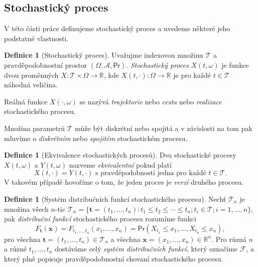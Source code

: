 \documentclass[a4paper,12pt]{report}
\theoremstyle{definition} \newtheorem{definice}[veta]{Definice}
\theoremstyle{remark}
\begin{document}
\subsection{Stochastický proces}
V této části práce definujeme stochastický proces a uvedeme některé jeho podstatné vlastnosti.
\begin{definice}[Stochastický proces]
Uvažujme  indexovou množinu $\mathcal{T}$ a pravděpodobnostní prostor $(\Omega,\mathcal{A}, \mathsf{Pr})$.
\textit{Stochastický proces} $X(t,\omega)$ je funkce dvou proměnných $X:\mathcal{T}\times\Omega\to\mathbb{R}$, kde 
$X(t,\cdot):\Omega\to\mathbb{R}$ je pro každé $t\in\mathcal{T}$ náhodná veličina.

Reálná funkce $X(\cdot,\omega)$ se nazývá \textit{trajektorie} nebo \textit{cesta} nebo \textit{realizace} stochastického procesu. 
\end{definice}
Množina parametrů $\mathcal{T}$ může být diskrétní nebo spojitá a v závislosti na tom pak mluvíme o \textit{diskrétním} nebo \textit{spojitém} stochastickém procesu. 

\begin{definice}[Ekvivalence stochastických procesů]
Dva stochastické procesy $X(t,\omega)$ a $Y(t,\omega)$ nazveme \textit{ekvivalentní} pokud platí
$$X(t,\cdot)=Y(t,\cdot)\text{ s pravděpodobností jedna pro každé }t\in\mathcal{T}.$$ 
V takovém případě hovoříme o tom, že jeden proces je \textit{verzí} druhého procesu.
\end{definice}

\begin{definice}[Systém distribučních funkcí stochastického procesu]
Nechť $\mathcal{T}_n$ je množina všech $n$-tic $\mathcal{T}_n=\{\boldsymbol{t}=(t_1,\dots,t_n):t_1\leq t_2\leq\cdots\leq t_n; t_i\in\mathcal{T}; i=1,\dots,n\}$,
pak \textit{distribuční funkcí} stochastického procesu rozumíme funkci
$$F_{\boldsymbol{t}}(\boldsymbol{x})=F_{t_1,\dots,t_n}(x_1,\dots,x_n)= \mathsf{Pr}(X_{t_1}\leq x_1,\dots,X_{t_n}\leq x_n),$$
pro všechna $\boldsymbol{t}=(t_1,\dots,t_n)\in \mathcal{T}_n$ a všechna $\boldsymbol{x}=(x_1,\dots,x_n)\in \mathbb{R}^n$.
Pro různá $n$ a různé $t_1,\dots,t_n$ dostáváme celý \textit{systém distribučních funkcí}, který označíme $\mathcal{F}$, a který plně popisuje pravděpodobnostní chovaní stochastického procesu.

\end{definice}
\end{document}
